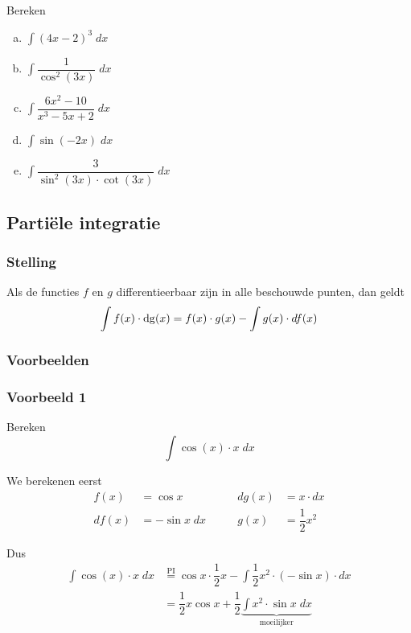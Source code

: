 \documentclass[a4paper,12pt, twoside]{article}
\begin{document}
\begin{oefening}
  Bereken
  \begin{multicols}{2}
  \begin{enumerate}[(a)]
  \item $\displaystyle\int (4x-2)^3 \;dx$
  \item $\displaystyle\int \dfrac{1}{\cos^2(3x)} \;dx$
  \item $\displaystyle\int \dfrac{6x^2-10}{x^3-5x+2} \;dx$
  \item $\displaystyle\int \sin(-2x) \;dx$
  \item $\displaystyle\int \dfrac{3}{\sin^2(3x) \cdot \cot(3x)}  \;dx$
  \end{enumerate}
\end{multicols}
\end{oefening}

\subsection{Partiële integratie}

\subsubsection{Stelling}


\begin{mdframed}
Als de functies $f$ en $g$ differentieerbaar zijn in alle beschouwde punten, dan geldt
$$\int f(x) \cdot \dg(x) = f(x) \cdot g(x) - \int g(x) \cdot df(x)$$
\end{mdframed}

\subsubsection{Voorbeelden}

\subsubsection*{Voorbeeld 1}
Bereken
$$\int \cos(x)\cdot x\;dx$$

We berekenen eerst
\begin{alignat*}{3}
  f(x) &= \cos x \qquad & dg(x) &= x\cdot dx\\
  df(x) &= - \sin x \; dx \qquad & g(x) &= \dfrac{1}{2} x^2
\end{alignat*}

Dus
\begin{align*}
  \int \cos(x)\cdot x\;dx
  &\overset{\text{PI}}{=} \cos x \cdot \dfrac{1}{2}x - \int \dfrac{1}{2} x^2 \cdot (-\sin x) \cdot dx\\
  &= \dfrac{1}{2}x \cos x + \dfrac{1}{2} \underbrace{\int x^2 \cdot \sin x \; dx}_{\text{moeilijker}}
\end{align*}
\end{document}
